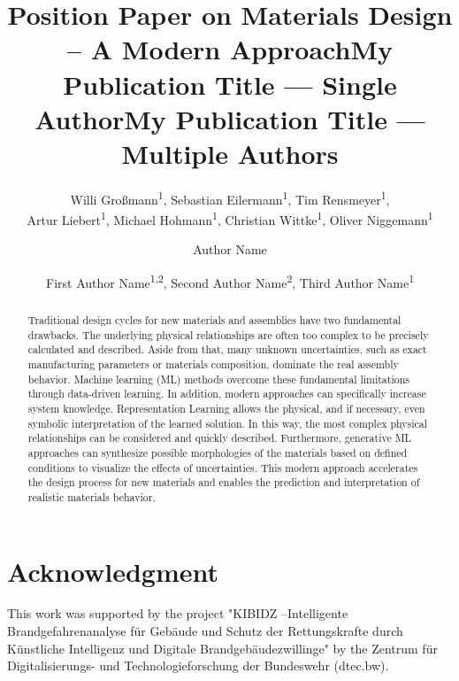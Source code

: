 \documentclass[letterpaper]{article} %
\title{Position Paper on Materials Design -- A Modern Approach}
\author{
    Willi Gro{\ss}mann\textsuperscript{\rm 1}, %
    Sebastian Eilermann\textsuperscript{\rm 1}, %
    Tim Rensmeyer\textsuperscript{\rm 1}, \\
    Artur Liebert\textsuperscript{\rm 1},  Michael Hohmann\textsuperscript{\rm 1}, Christian Wittke\textsuperscript{\rm 1},
    Oliver Niggemann\textsuperscript{\rm 1}
}
\title{My Publication Title --- Single Author}
\author {
    Author Name
}
\title{My Publication Title --- Multiple Authors}
\author {
    First Author Name\textsuperscript{\rm 1,\rm 2},
    Second Author Name\textsuperscript{\rm 2},
    Third Author Name\textsuperscript{\rm 1}
}
\begin{document}
\maketitle
\thispagestyle{fancy}

\begin{abstract}
Traditional design cycles for new materials and assemblies have two fundamental drawbacks. The underlying physical relationships are often too complex to be precisely calculated and described. Aside from that, many unknown uncertainties, such as exact manufacturing parameters or materials composition, dominate the real assembly behavior. Machine learning (ML) methods overcome these fundamental limitations through data-driven learning. In addition, modern approaches can specifically increase system knowledge. Representation Learning allows the physical, and if necessary, even symbolic interpretation of the learned solution. In this way, the most complex physical relationships can be considered and quickly described. Furthermore, generative ML approaches can synthesize possible morphologies of the materials based on defined conditions to visualize the effects of uncertainties. This modern approach accelerates the design process for new materials and enables the prediction and interpretation of realistic materials behavior.

\end{abstract}









\section{Acknowledgment}
\label{Ackn}
This work was supported by the project "KIBIDZ --Intelligente Brandgefahrenanalyse f\"ur Geb\"aude und Schutz der Rettungskrafte durch K\"unstliche Intelligenz und Digitale Brandgeb\"audezwillinge" by the Zentrum f\"ur Digitalisierungs- und Technologieforschung der Bundeswehr (dtec.bw).



\end{document}
